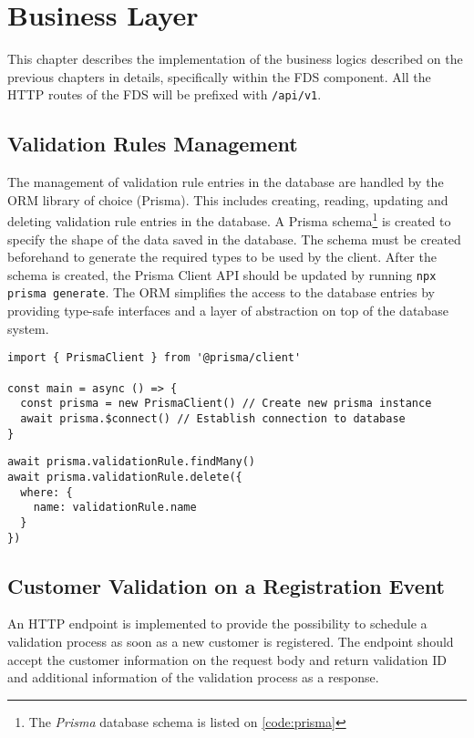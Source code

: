 \section{Business Layer}

  This chapter describes the implementation of the business logics described on the previous chapters in details, specifically within the FDS component. All the HTTP routes of the FDS will be prefixed with \verb;/api/v1;.

  \subsection{Validation Rules Management} 
    The management of validation rule entries in the database are handled by the ORM library of choice (Prisma). This includes creating, reading, updating and deleting validation rule entries in the database. A Prisma schema\footnote{The \emph{Prisma} database schema is listed on \autoref{code:prisma}} is created to specify the shape of the data saved in the database. The schema must be created beforehand to generate the required types to be used by the client. After the schema is created, the Prisma Client API should be updated by running \verb;npx prisma generate;. The ORM simplifies the access to the database entries by providing type-safe interfaces and a layer of abstraction on top of the database system. 

  \begin{lstlisting}[style=es6, caption={Establishing database connection with Prisma (TypeScript)}]
import { PrismaClient } from '@prisma/client'

const main = async () => {
  const prisma = new PrismaClient() // Create new prisma instance
  await prisma.$connect() // Establish connection to database
}
\end{lstlisting}  

  \begin{lstlisting}[style=es6, caption={Example usage of Prisma (TypeScript)}]
await prisma.validationRule.findMany()
await prisma.validationRule.delete({
  where: {
    name: validationRule.name
  }
})
\end{lstlisting}

  \subsection{Customer Validation on a Registration Event}

    An HTTP endpoint is implemented to provide the possibility to schedule a validation process as soon as a new customer is registered. The endpoint should accept the customer information on the request body and return validation ID and additional information of the validation process as a response. 
    
